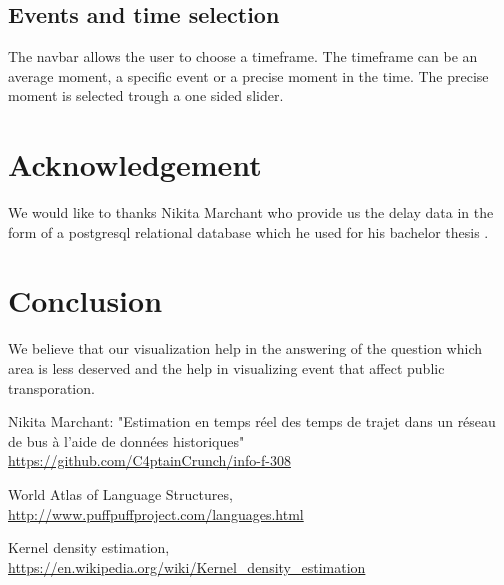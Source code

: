 \documentclass[11pt]{article}%
\begin{document}
\subsection{Events and time selection}

The navbar allows the user to choose a timeframe. The timeframe can be an average moment, a specific event or a precise moment in the time. The precise moment is selected trough a one sided slider.

\section{Acknowledgement}

We would like to thanks Nikita Marchant who provide us the delay data in the form of a postgresql relational database which he used for his bachelor thesis \cite{nikita}. 

\section{Conclusion}
We believe that our visualization help in the answering of the question which area is less deserved and the help in visualizing event that affect public transporation. 

 
\begin{thebibliography}{9}
 
Nikita Marchant: "Estimation en temps réel des temps de trajet dans un réseau de bus à l'aide de données historiques"
\\\url{https://github.com/C4ptainCrunch/info-f-308}

World Atlas of Language Structures,
\\\url{http://www.puffpuffproject.com/languages.html}

Kernel density estimation,
\\\url{https://en.wikipedia.org/wiki/Kernel_density_estimation}



\end{thebibliography}
\end{document}
